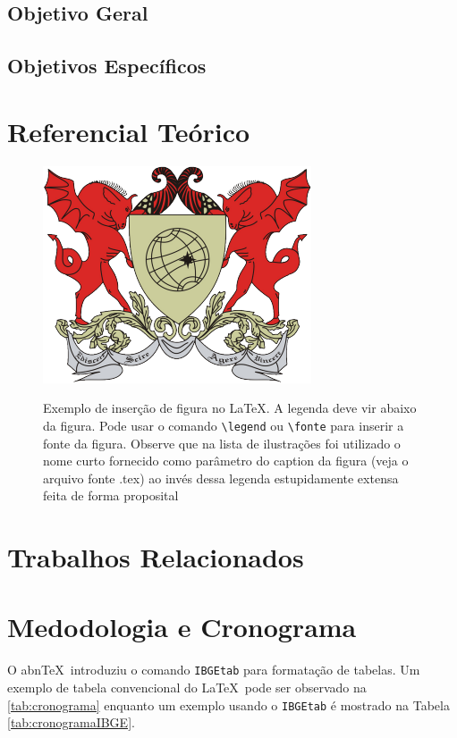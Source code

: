 \documentclass[
	12pt, %
	openright, %
	oneside, %
	a4paper, %
  sumario=tradicional, %
	english, %
	brazil, %
]{abntex2} %
\begin{document}
\section{Objetivo Geral}

\section{Objetivos Específicos}

\chapter{Referencial Teórico}\label{sec:RefTeorico}
\begin{figure}[htbp]
  \begin{center}
  \includegraphics[width=.5\linewidth]{logoufv}\\
  \end{center}
  \caption[Exemplo de Figura]{Exemplo de inserção de figura no \LaTeX. A legenda deve vir abaixo da figura. Pode usar o comando \texttt{\textbackslash legend} ou \texttt{\textbackslash fonte} para inserir a fonte da figura. Observe que na lista de ilustrações foi utilizado o nome curto fornecido como parâmetro do caption da figura (veja o arquivo fonte .tex) ao invés dessa legenda estupidamente extensa feita de forma proposital}
  \label{fig:logo}
\end{figure}

\chapter{Trabalhos Relacionados}\label{sec:TrabRel}

\chapter{Medodologia e Cronograma}\label{sec:metodos}

O abn\TeX\ introduziu o comando \texttt{IBGEtab} para formatação de tabelas. Um exemplo de tabela convencional do \LaTeX\ pode ser observado na \autoref{tab:cronograma} enquanto um exemplo usando o \texttt{IBGEtab} é mostrado na Tabela \ref{tab:cronogramaIBGE}.
\end{document}
